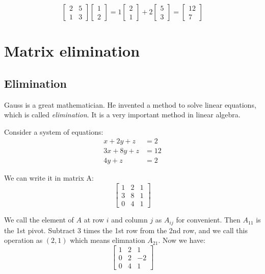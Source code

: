 \documentclass[10pt,a4paper,oneside,numbers=noenddot]{scrbook}
\theoremstyle{ctplain}
\theoremstyle{ctresult}
\begin{document}
\[
  \begin{bmatrix} 2 & 5 \\ 1 & 3 \end{bmatrix}
  \begin{bmatrix} 1 \\ 2 \end{bmatrix}
  =
  1 \begin{bmatrix} 2 \\ 1 \end{bmatrix} +
  2 \begin{bmatrix} 5 \\ 3 \end{bmatrix}
  =
  \begin{bmatrix} 12 \\7 \end{bmatrix}
\]

\section{Matrix elimination}
\subsection{Elimination}

Gauss is a great mathematician. He invented a method to solve linear equations, which is
called \emph{elimination}. It is a very important method in linear algebra.

Consider a system of equations:
\begin{equation}
    \begin{aligned}
        x + 2y + z &= 2 \\
        3x + 8y + z &= 12 \\
        4y + z &= 2
    \end{aligned}
\end{equation}

We can write it in matrix A:
\[
  \begin{bmatrix}
    1 & 2 & 1 \\
    3 & 8 & 1 \\
    0 & 4 & 1
  \end{bmatrix}
\]

We call the element of $A$ at row $i$ and column $j$ as $A_{ij}$ for convenient. Then
$A_{11}$ is the 1st pivot. Subtract 3 times the 1st row from the 2nd row, and we call
this operation as $(2, 1)$ which means elimnation $A_{21}$. Now we have:
\[
  \begin{bmatrix}
    1 & 2 & 1 \\
    0 & 2 & -2 \\
    0 & 4 & 1
  \end{bmatrix}
\]
\end{document}
